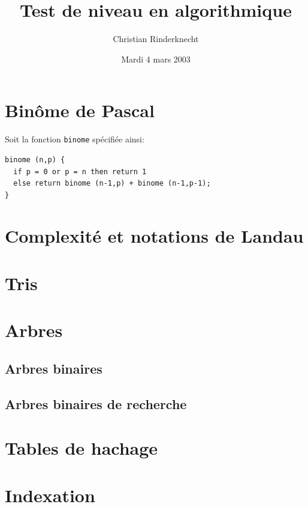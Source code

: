 \documentclass[11pt, a4paper]{article}
\title{Test de niveau en algorithmique}
\author{Christian Rinderknecht}
\date{Mardi 4 mars 2003}
\begin{document}
\maketitle

\section{Binôme de Pascal}

\noindent Soit la fonction \verb+binome+ spécifiée ainsi:

\begin{verbatim}
binome (n,p) {
  if p = 0 or p = n then return 1
  else return binome (n-1,p) + binome (n-1,p-1);
}
\end{verbatim}


\section{Complexité et notations de Landau}



\section{Tris}



\section{Arbres}

  \subsection{Arbres binaires}

  

  \subsection{Arbres binaires de recherche}

  

\section{Tables de hachage}



\section{Indexation}
\end{document}
